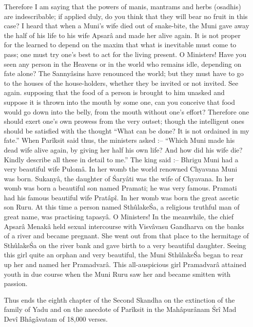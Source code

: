 Therefore I am saying that the powers of manis, mantrams and herbs (osadhis) are indescribable; if applied duly, do you think that they will bear no fruit in this case? I heard that when a Muni's wife died out of snake-bite, the Muni gave away the half of his life to his wife Apsar\^a and made her alive again. It is not proper for the learned to depend on the maxim that what is inevitable must come to pass; one must try one's best to act for the living present. O Ministers! Have you seen any person in the Heavens or in the world who remains idle, depending on fate alone? The Sanny\^asins have renounced the world; but they must have to go to the houses of the house-holders, whether they be invited or not invited. See again. supposing that the food of a person is brought to him unasked and suppose it is thrown into the mouth by some one, can you conceive that food would go down into the belly, from the mouth without one's effort? Therefore one should exert one's own prowess from the very outset; though the intelligent ones should be satisfied with the thought ``What can be done? It is not ordained in my fate.'' When Par\^iksit said thus, the ministers asked :-- ``Which Muni made his dead wife alive again, by giving her half his own life? And how did his wife die? Kindly describe all these in detail to me.'' The king said :-- Bhrigu Muni had a very beautiful wife Pulom\^a. In her womb the world renowned Chyavana Muni was born. Sukany\^a, the daughter of \'Sary\^ati was the wife of Chyavana. In her womb was born a beautiful son named Pramati; he was very famous. Pramati had his famous beautiful wife Prat\^ap\^i. In her womb was born the great ascetic son Ruru. At this time a person named Sth\^ulake\'Sa, a religious truthful man of great name, was practising tapasy\^a. O Ministers! In the meanwhile, the chief Apsar\^a Menak\^a held sexual intercourse with Visv\^avasu Gandharva on the banks of a river and became pregnant. She went out from that place to the hermitage of Sth\^ulake\'Sa on the river bank and gave birth to a very beautiful daughter. Seeing this girl quite an orphan and very beautiful, the Muni Sth\^ulake\'Sa began to rear up her and named her Pramadvar\^a. This all-auspicious girl Pramadvar\^a attained youth in due course when the Muni Ruru saw her and became smitten with passion.

Thus ends the eighth chapter of the Second Skandha on the extinction of the family of Yadu and on the anecdote of Par\^iksit in the Mah\^apur\^anam \'Sr\^i Mad Dev\^i Bh\^ag\^avatam of 18,000 verses.